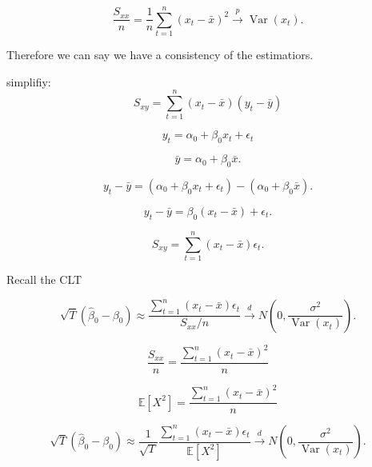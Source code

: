 \documentclass{article} %
\begin{document}
\begin{equation}
 \frac{S_{xx}}{n} = \frac{1}{n}\sum_{t=1}^n (x_t - \bar{x})^2 \overset{p}{\longrightarrow} \operatorname{Var}(x_t).
\end{equation}

Therefore we can say we have a consistency of the estimatiors. 

simplifiy:
\begin{equation}
    S_{xy} = \sum_{t=1}^n (x_t - \bar{x})(y_t - \bar{y})
\end{equation}


\begin{equation}
 y_t = \alpha_0 + \beta_0 x_t + \epsilon_t
\end{equation}


\begin{equation}
 \bar{y} = \alpha_0 + \beta_0 \bar{x}.
\end{equation}

\begin{equation}
 y_t - \bar{y} = (\alpha_0 + \beta_0 x_t + \epsilon_t) - (\alpha_0 + \beta_0 \bar{x}).
\end{equation}

\begin{equation}
y_t - \bar{y} = \beta_0 (x_t - \bar{x}) + \epsilon_t.
\end{equation}

\begin{equation}
 S_{xy} = \sum_{t=1}^n (x_t - \bar{x})\epsilon_t.
\end{equation}


Recall the CLT

\begin{equation}
 \sqrt{T}(\hat{\beta}_0 - \beta_0) \approx  \frac{\sum_{t=1}^n (x_t - \bar{x})\epsilon_t}{S_{xx}/n} \xrightarrow{d} N\!\left(0, \frac{\sigma^2}{\operatorname{Var}(x_t)}\right).
\end{equation}


\begin{equation}
    \frac{S_{xx}}{n} = \frac{\sum_{t=1}^n (x_t - \bar{x})^2}{n}
\end{equation}
   

\begin{equation}
  \mathbb{E}[X^2]  = \frac{\sum_{t=1}^n (x_t - \bar{x})^2}{n}
\end{equation}
   
\begin{equation}
    \sqrt{T}(\hat{\beta}_0 - \beta_0) \approx \frac{1}{\sqrt{T}} \frac{\sum_{t=1}^n (x_t - \bar{x})\epsilon_t}{\mathbb{E}[X^2] } \xrightarrow{d} N\!\left(0, \frac{\sigma^2}{\operatorname{Var}(x_t)}\right).
\end{equation}
\end{document}
